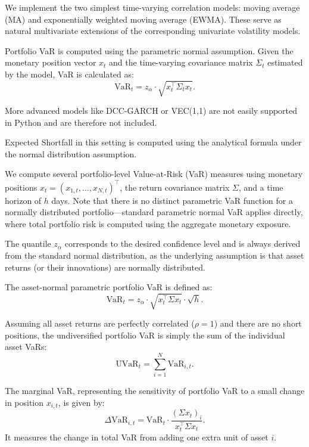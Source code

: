 \documentclass[12pt]{article}
\begin{document}
\vspace{1em}
\underline{}

\vspace{0.6em}

We implement the two simplest time-varying correlation models: moving average (MA) and exponentially weighted moving average (EWMA). These serve as natural multivariate extensions of the corresponding univariate volatility models.

Portfolio VaR is computed using the parametric normal assumption. Given the monetary position vector $x_t$ and the time-varying covariance matrix $\Sigma_t$ estimated by the model, VaR is calculated as:
\[
\text{VaR}_t = z_\alpha \cdot \sqrt{x_t^\top \Sigma_t x_t}.
\]

More advanced models like DCC-GARCH or VEC(1,1) are not easily supported in Python and are therefore not included.

Expected Shortfall in this setting is computed using the analytical formula under the normal distribution assumption.


\vspace{1em}
\underline{}

\vspace{0.6em}

We compute several portfolio-level Value-at-Risk (VaR) measures using monetary positions $x_t = (x_{1,t}, \dots, x_{N,t})^\top$, the return covariance matrix $\Sigma$, and a time horizon of $h$ days. Note that there is no distinct parametric VaR function for a normally distributed portfolio—standard parametric normal VaR applies directly, where total portfolio risk is computed using the aggregate monetary exposure.

The quantile $z_\alpha$ corresponds to the desired confidence level and is always derived from the standard normal distribution, as the underlying assumption is that asset returns (or their innovations) are normally distributed.

The asset-normal parametric portfolio VaR is defined as:
\[
  \text{VaR}_t = z_\alpha \cdot \sqrt{x_t^\top \Sigma x_t} \cdot \sqrt{h}.
\]

Assuming all asset returns are perfectly correlated ($\rho = 1$) and there are no short positions, the undiversified portfolio VaR is simply the sum of the individual asset VaRs:
\[
  \text{UVaR}_t = \sum_{i=1}^N \text{VaR}_{i,t}.
\]

The marginal VaR, representing the sensitivity of portfolio VaR to a small change in position $x_{i,t}$, is given by:
\[
  \Delta \text{VaR}_{i,t} = \text{VaR}_t \cdot \frac{(\Sigma x_t)_i}{x_t^\top \Sigma x_t}.
\]
It measures the change in total VaR from adding one extra unit of asset $i$.
\end{document}
